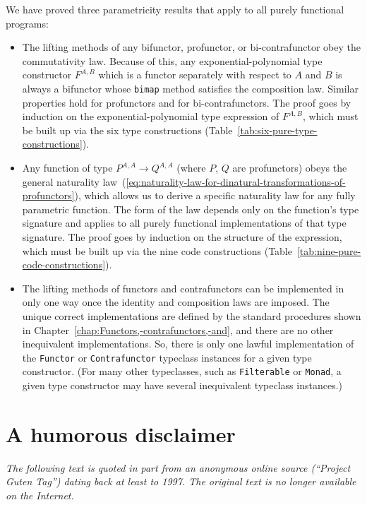 We have proved three parametricity results that apply to all purely
functional programs:
\begin{itemize}
\item The lifting methods of any bifunctor, profunctor, or bi-contrafunctor
obey the commutativity law. Because of this, any exponential-polynomial
type constructor $F^{A,B}$ which is a functor separately with respect
to $A$ and $B$ is always a bifunctor whose \lstinline!bimap! method
satisfies the composition law. Similar properties hold for profunctors
and for bi-contrafunctors. The proof goes by induction on the exponential-polynomial
type expression of $F^{A,B}$, which must be built up via the six
type constructions (Table~\ref{tab:six-pure-type-constructions}).
\item Any function of type $P^{A,A}\rightarrow Q^{A,A}$ (where $P$, $Q$
are profunctors) obeys the general naturality law~(\ref{eq:naturality-law-for-dinatural-transformations-of-profunctors}),
which allows us to derive a specific naturality law for any fully
parametric function. The form of the law depends only on the function's
type signature and applies to all purely functional implementations
of that type signature. The proof goes by induction on the structure
of the expression, which must be built up via the nine code constructions
(Table~\ref{tab:nine-pure-code-constructions}).
\item The lifting methods of functors and contrafunctors can be implemented
in only one way once the identity and composition laws are imposed.
The unique correct implementations are defined by the standard procedures
shown in Chapter~\ref{chap:Functors,-contrafunctors,-and}, and there
are no other inequivalent implementations. So, there is only one lawful
implementation of the \lstinline!Functor! or \lstinline!Contrafunctor!
typeclass instances for a given type constructor. (For many other
typeclasses, such as \lstinline!Filterable! or \lstinline!Monad!,
a given type constructor may have several inequivalent typeclass instances.)
\end{itemize}

\chapter{A humorous disclaimer}

\emph{The following text is quoted in part from an anonymous online
source (``Project Guten Tag'') dating back at least to 1997. The
original text is no longer available on the Internet.}

